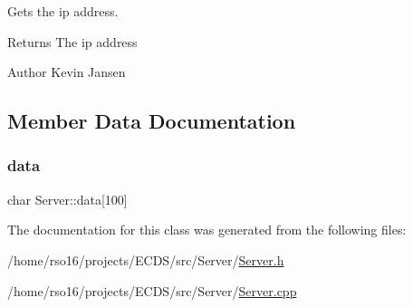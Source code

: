 Gets the ip address. 

\begin{DoxyReturn}{Returns}
The ip address 
\end{DoxyReturn}
\begin{DoxyAuthor}{Author}
Kevin Jansen 
\end{DoxyAuthor}


\subsection{Member Data Documentation}
\mbox{\label{classServer_a511bae2c5604c196eb714c798fdf709d}} 
\subsubsection{\texorpdfstring{data}{data}}
{\footnotesize\ttfamily char Server\+::data\mbox{[}100\mbox{]}}



The documentation for this class was generated from the following files\+:\begin{DoxyCompactItemize}
\item 
/home/rso16/projects/\+E\+C\+D\+S/src/\+Server/\hyperlink{Server_8h}{Server.\+h}\item 
/home/rso16/projects/\+E\+C\+D\+S/src/\+Server/\hyperlink{Server_8cpp}{Server.\+cpp}\end{DoxyCompactItemize}
